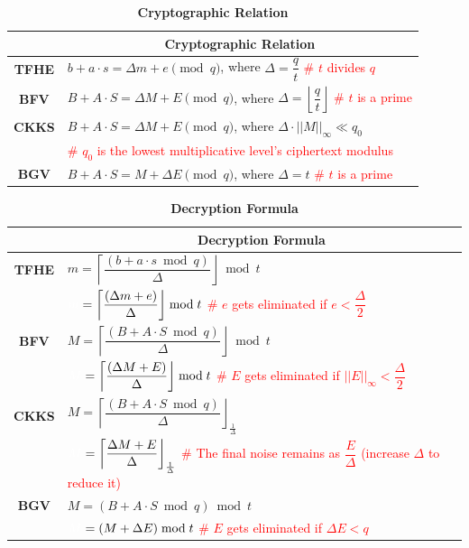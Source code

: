 \begin{table}[h]
\begin{tabular}{|c||l|}
\hline
&\multicolumn{1}{c|}{\textbf{Cryptographic Relation}}\\\hline\hline
\textbf{TFHE}&$b + a\cdot s = \Delta m + e \pmod q$, \text{ } where $\Delta = \dfrac{q}{t}$  \text{ } \textcolor{red}{\# $t$ divides $q$}\\\hline
\textbf{BFV}&$B + A\cdot S = \Delta M + E \pmod q$, \text{ } where $\Delta = \left\lfloor\dfrac{q}{t}\right\rfloor$ \text{ } \textcolor{red}{\# $t$ is a prime}\\\hline
\textbf{CKKS}&$B + A\cdot S = \Delta M + E \pmod q$, \text{ } where $\Delta \cdot ||M||_\infty \ll q_0$\\
& \text{ } \textcolor{red}{\# $q_0$ is the lowest multiplicative level's ciphertext modulus}\\\hline
\textbf{BGV}&$B + A\cdot S = M + \Delta E \pmod q$, \text{ } where $\Delta = t$  \text{ } \textcolor{red}{\# $t$ is a prime}\\\hline
\end{tabular}
\caption{\textbf{Cryptographic Relation}}
\end{table}


\begin{table}[h]
\begin{tabular}{|c||l|}
\hline
&\multicolumn{1}{c|}{\textbf{Decryption Formula}}\\\hline\hline
\textbf{TFHE}&$m = \left\lceil\dfrac{(b + a\cdot s \bmod q)}{\Delta}\right\rfloor \bmod t$\\
&$\textcolor{white}{m} = \left\lceil\dfrac{(\Delta m + e)}{\Delta}\right\rfloor \bmod t$ \text{ } \textcolor{red}{ \# $e$ gets eliminated if $e < \dfrac{\Delta}{2}$}\\\hline
\textbf{BFV}&$M = \left\lceil\dfrac{(B + A\cdot S \bmod q)}{\Delta}\right\rfloor  \bmod t$\\
&$\textcolor{white}{M} = \left\lceil\dfrac{(\Delta M + E)}{\Delta}\right\rfloor  \bmod t$ \text{ } \textcolor{red}{ \# $E$ gets eliminated if $||E||_\infty < \dfrac{\Delta}{2}$}\\\hline
\textbf{CKKS}&$M = \left\lceil\dfrac{(B + A\cdot S \bmod q)}{\Delta}\right\rfloor_{\frac{1}{\Delta}}$\\
&$\textcolor{white}{M} = \left\lceil\dfrac{\Delta M + E}{\Delta}\right\rfloor_{\frac{1}{\Delta}}$ \text{ } \textcolor{red}{ \# The final noise remains as $\dfrac{E}{\Delta}$ (increase $\Delta$ to reduce it)}\\\hline
\textbf{BGV}&$M = (B + A\cdot S \bmod q) \bmod t$\\
&$\textcolor{white}{M} = (M + \Delta E) \bmod t$ \text{ } \textcolor{red}{ \# $E$ gets eliminated if $\Delta E < q$}\\\hline
\end{tabular}
\caption{\textbf{Decryption Formula}}
\end{table}

